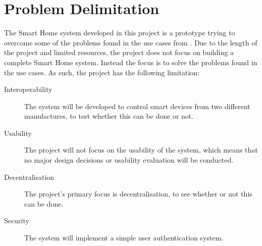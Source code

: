 \section{Problem Delimitation} \label{sec:problem-delimitation}

The Smart Home system developed in this project is a prototype trying to overcome some of the problems found in the use cases from . Due to the length of the project and limited resources, the project does not focus on building a complete Smart Home system.
Instead the focus is to solve the problems found in the use cases. As such, the project has the following limitation: 

\begin{description}
\item[Interoperability] The system will be developed to control smart devices from two different manufactures, to test whether this can be done or not.
\item[Usability] The project will not focus on the usability of the system, which means that no major design decisions or usability evaluation will be conducted.
\item[Decentralisation] The project's primary focus is decentralisation, to see whether or not this can be done.
\item[Security] The system will implement a simple user authentication system. 
\end{description}
